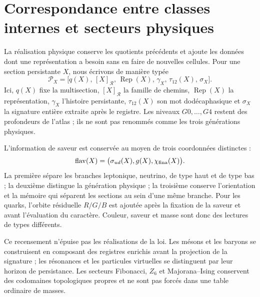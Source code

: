 \chapter[Correspondance avec les secteurs physiques]{Correspondance entre classes internes et secteurs physiques}
\label{sec:censo-fisico-atlas-rev7}

La réalisation physique conserve les quotients précédents et ajoute les données
dont une représentation a besoin sans en faire de nouvelles cellules. Pour une
section persistante \(X\), nous écrivons de manière typée
\[
 \mathcal P_X=
 \bigl[q(X),\,[X]_{\mathcal R},\,\operatorname{Rep}(X),\,
       \gamma_X,\,\tau_{12}(X),\,\sigma_X\bigr].
\]
Ici, \(q(X)\) fixe la multisection, \([X]_{\mathcal R}\) la famille de chemins,
\(\operatorname{Rep}(X)\) la représentation, \(\gamma_X\) l'histoire
persistante, \(\tau_{12}(X)\) son mot dodécaphasique et \(\sigma_X\) la signature
entière extraite après le registre. Les niveaux \(G0,\ldots,G4\) restent
des profondeurs de l'atlas ; ils ne sont pas renommés comme les trois générations
physiques.

L'information de saveur est conservée au moyen de trois coordonnées distinctes :
\[
 \operatorname{flav}(X)=
 \bigl(\sigma_{ud}(X),g(X),\chi_{\rm fina}(X)\bigr).
\]
La première sépare les branches leptonique, neutrino, de type haut et de type bas ;
la deuxième distingue la génération physique ; la troisième conserve
l'orientation et la mémoire qui séparent les sections au sein d'une même branche. Pour
les quarks, l'orbite résiduelle \(R/G/B\) est ajoutée après la fixation de la saveur et
avant l'évaluation du caractère. Couleur, saveur et masse sont donc des lectures de
types différents.


Ce recensement n'épuise pas les réalisations de la loi. Les mésons et les baryons se
construisent en composant des registres enrichis avant la projection de la signature ;
les résonances et les particules virtuelles se distinguent par leur horizon de
persistance. Les secteurs Fibonacci, \(Z_6\) et Majorana--Ising conservent
des codomaines topologiques propres et ne sont pas forcés dans une table ordinaire
de masses.

